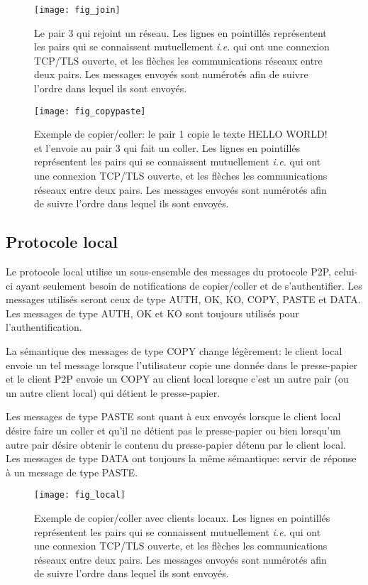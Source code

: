 \begin{figure}[!h]
  \centering
  \texttt{[image: fig\_join]}
  \caption{Le pair 3 qui rejoint un réseau. Les lignes en pointillés
    représentent les pairs qui se connaissent mutuellement \emph{i.e.} qui ont
    une connexion TCP/TLS ouverte, et les flèches les communications réseaux
    entre deux pairs. Les messages envoyés sont numérotés afin de suivre
    l'ordre dans lequel ils sont envoyés.}
  \label{fig:join}
\end{figure}

\begin{figure}[!h]
  \centering
  \texttt{[image: fig\_copypaste]}
  \caption{Exemple de copier/coller: le pair 1 copie le texte HELLO WORLD!
    et l'envoie au pair 3 qui fait un coller. Les lignes en pointillés
    représentent les pairs qui se connaissent mutuellement \emph{i.e.} qui ont
    une connexion TCP/TLS ouverte, et les flèches les communications réseaux
    entre deux pairs. Les messages envoyés sont numérotés afin de suivre
    l'ordre dans lequel ils sont envoyés.}
  \label{fig:copypaste}
\end{figure}

\subsection{Protocole local}
Le protocole local utilise un sous-ensemble des messages du protocole P2P,
celui-ci ayant seulement besoin de notifications de copier/coller et de
s'authentifier.
Les messages utilisés seront ceux de type AUTH, OK, KO, COPY, PASTE et DATA.
Les messages de type AUTH, OK et KO sont toujours utilisés pour
l'authentification.

La sémantique des messages de type COPY change légèrement: le client
local envoie un tel message lorsque l'utilisateur copie une donnée dans le
presse-papier et le client P2P envoie un COPY au client local lorsque
c'est un autre pair (ou un autre client local) qui détient le presse-papier.

Les messages de type PASTE sont quant à eux envoyés lorsque le client local
désire faire un coller et qu'il ne détient pas le presse-papier ou bien
lorsqu'un autre pair désire obtenir le contenu du presse-papier détenu par le
client local. Les messages de type DATA ont toujours la même sémantique:
servir de réponse à un message de type PASTE.

\begin{figure}[!h]
  \centering
  \texttt{[image: fig\_local]}
  \caption{Exemple de copier/coller avec clients locaux. Les lignes en
    pointillés représentent les pairs qui se connaissent mutuellement
    \emph{i.e.} qui ont une connexion TCP/TLS ouverte, et les flèches les
    communications réseaux entre deux pairs. Les messages envoyés sont
    numérotés afin de suivre l'ordre dans lequel ils sont envoyés.}
  \label{fig:local}
\end{figure}

